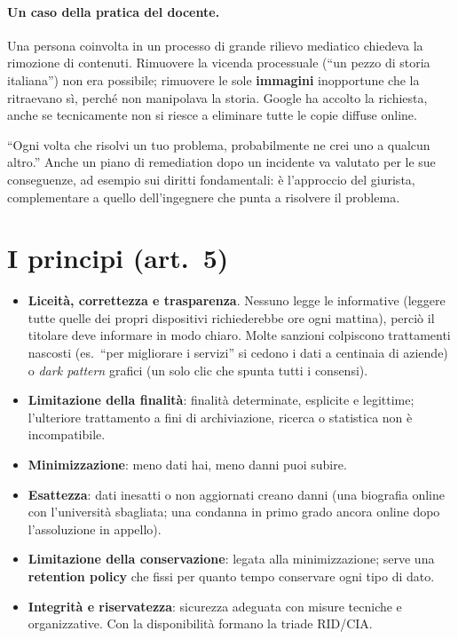 \paragraph{Un caso della pratica del docente.} Una persona coinvolta in un processo di grande rilievo
mediatico chiedeva la rimozione di contenuti. Rimuovere la vicenda processuale (``un pezzo di storia
italiana'') non era possibile; rimuovere le sole \textbf{immagini} inopportune che la ritraevano sì,
perché non manipolava la storia. Google ha accolto la richiesta, anche se tecnicamente non si riesce a
eliminare tutte le copie diffuse online.

\begin{nota}
``Ogni volta che risolvi un tuo problema, probabilmente ne crei uno a qualcun altro.'' Anche un piano
di remediation dopo un incidente va valutato per le sue conseguenze, ad esempio sui diritti
fondamentali: è l'approccio del giurista, complementare a quello dell'ingegnere che punta a risolvere
il problema.
\end{nota}

\section{I principi (art.~5)}
\begin{itemize}
  \item \textbf{Liceità, correttezza e trasparenza}. Nessuno legge le informative (leggere tutte
    quelle dei propri dispositivi richiederebbe ore ogni mattina), perciò il titolare deve informare in
    modo chiaro. Molte sanzioni colpiscono trattamenti nascosti (es.\ ``per migliorare i servizi''
    si cedono i dati a centinaia di aziende) o \emph{dark pattern} grafici (un solo clic che spunta
    tutti i consensi).
  \item \textbf{Limitazione della finalità}: finalità determinate, esplicite e legittime; l'ulteriore
    trattamento a fini di archiviazione, ricerca o statistica non è incompatibile.
  \item \textbf{Minimizzazione}: meno dati hai, meno danni puoi subire.
  \item \textbf{Esattezza}: dati inesatti o non aggiornati creano danni (una biografia online con
    l'università sbagliata; una condanna in primo grado ancora online dopo l'assoluzione in appello).
  \item \textbf{Limitazione della conservazione}: legata alla minimizzazione; serve una
    \textbf{retention policy} che fissi per quanto tempo conservare ogni tipo di dato.
  \item \textbf{Integrità e riservatezza}: sicurezza adeguata con misure tecniche e organizzative.
    Con la disponibilità formano la triade RID/CIA.
\end{itemize}

